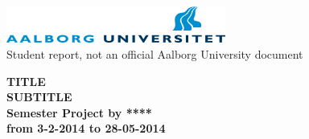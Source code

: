 \thispagestyle{empty} %
\begin{center}
	\includegraphics[height=1.2cm]{media/aau-logo}\\
	\vspace{0.25cm}
	Student report, not an official Aalborg University document
\end{center} 

\vspace{1cm}
\begin{center}
\textbf{\Huge {TITLE}} \\ \vspace{0.5cm}
\textbf{\huge {SUBTITLE}} \\ \vspace{1cm}
\textbf{\Large Semester Project by ****}\\ \vspace{0.5cm}
\textbf{\large from 3-2-2014 to 28-05-2014}\\
\end{center}

\vspace{0.25cm}


\thispagestyle{empty}

\newpage
\thispagestyle{empty}
\mbox{}


